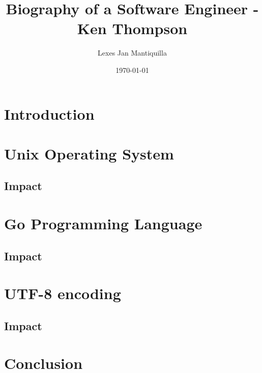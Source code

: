 \documentclass{article}
\title{Biography of a Software Engineer - Ken Thompson}
\author{Lexes Jan Mantiquilla}
\date{\today}
\begin{document}
\maketitle

\section{Introduction}

\section{Unix Operating System}
\subsection{Impact}

\section{Go Programming Language}
\subsection{Impact}

\section{UTF-8 encoding}
\subsection{Impact}

\section{Conclusion}
\end{document}
